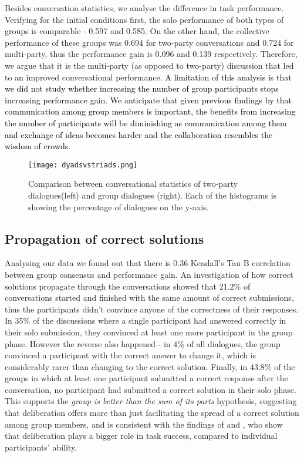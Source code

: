 \documentclass[acmsmall,manuscript,screen]{acmart}
\newcommand\newtext[1]{\textcolor{black}{#1}}
\begin{document}
Besides conversation statistics, we analyse the difference in task performance. Verifying for the initial conditions first, the solo performance of both types of groups is comparable - 0.597 and 0.585. On the other hand, the collective performance of these groups was 0.694 for two-party conversations and 0.724 for multi-party, thus the performance gain is 0.096 and 0.139 respectively. Therefore, we argue that it is the multi-party (as opposed to two-party) discussion that led to \newtext{an} improved conversational performance. \newtext{A limitation of this analysis is that we did not study whether increasing the number of group participants stops increasing performance gain. We anticipate that given previous findings by \citet{navajas2018aggregated} that communication among group members is important, the benefits from increasing the number of participants will be diminishing as communication among them and exchange of ideas becomes harder and the collaboration resembles the wisdom of crowds.}



\begin{figure}[!t]
\centering
\texttt{[image: dyadsvstriads.png]}
\caption{Comparison between conversational statistics of two-party dialogues(left) and group dialogues (right). Each of the histograms is showing the percentage of dialogues on the y-axis.}
\label{fig:dyadsvtriads}
\end{figure}

\subsection{Propagation of correct solutions}

Analysing our data we found out that there is 0.36 Kendall's Tau B correlation \citep{kendall} between group consensus and performance gain.
An investigation of how correct solutions propagate through the conversations showed that 21.2\% of conversations started and finished with the same amount of correct submissions, thus the participants didn't convince anyone of the correctness of their responses. In 35\% of the discussions where a single participant had answered correctly in their solo submission, they convinced at least one more participant in the group phase. However the reverse also happened - in 4\% of all dialogues, the group convinced a participant with the correct answer to change it, which is considerably rarer than changing to the correct solution. Finally, in 43.8\% of the groups in which at least one participant submitted a correct response after the conversation, no participant had submitted a correct solution in their solo phase. This supports
the \textit{group is better than the sum of its parts} hypothesis, suggesting that deliberation offers more than just facilitating the spread of a correct solution among group members, and is consistent with the findings of \citet{moshman1998collaborative}  and \citet{schulz2006group}, who show that deliberation plays a bigger role in task success, compared to individual participants' ability. 
\end{document}
